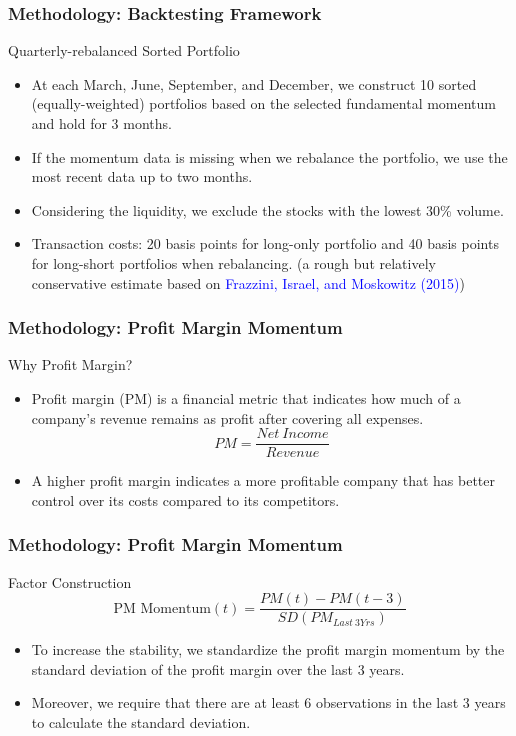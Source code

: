 \documentclass{beamer}
\begin{document}
\begin{frame}
    \frametitle{Methodology: Backtesting Framework}
    \begin{block}{Quarterly-rebalanced Sorted Portfolio}
        \begin{itemize}
            \item At each March, June, September, and December, we construct 10 sorted (equally-weighted) portfolios based on the selected fundamental momentum and hold for 3 months.
            \item If the momentum data is missing when we rebalance the portfolio, we use the most recent data up to two months.
            \item Considering the liquidity, we exclude the stocks with the lowest 30\% volume.
            \item Transaction costs: 20 basis points for long-only portfolio and 40 basis points for long-short portfolios when rebalancing. (a rough but relatively conservative estimate based on \textcolor{blue}{Frazzini, Israel, and Moskowitz (2015)})
        \end{itemize}
    \end{block}
\end{frame}

\begin{frame}
    \frametitle{Methodology: Profit Margin Momentum}
    \begin{block}{Why Profit Margin?}
        \begin{itemize}
            \item Profit margin (PM) is a financial metric that indicates how much of a company's revenue remains as profit after covering all expenses.
            \begin{equation}
                PM = \frac{Net~Income}{Revenue}
            \end{equation}
            \item A higher profit margin indicates a more profitable company that has better control over its costs compared to its competitors.
        \end{itemize}
    \end{block}
\end{frame}

\begin{frame}
    \frametitle{Methodology: Profit Margin Momentum}
    \begin{block}{Factor Construction}
        \begin{equation}
            \text{PM Momentum}(t) = \frac{PM(t) - PM(t-3)}{SD(PM_{Last~3Yrs})}
        \end{equation}
        \begin{itemize}
            \item To increase the stability, we standardize the profit margin momentum by the standard deviation of the profit margin over the last 3 years.
            \item Moreover, we require that there are at least 6 observations in the last 3 years to calculate the standard deviation.
        \end{itemize}
    \end{block}
\end{frame}
\end{document}
